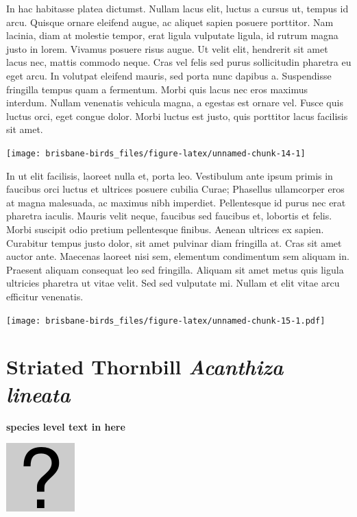 \documentclass[]{book}
\let\origfigure\figure
\let\endorigfigure\endfigure
\renewenvironment{figure}[1][2] {
  \expandafter\origfigure\expandafter[H]
} {
  \endorigfigure
}
\begin{document}
In hac habitasse platea dictumst. Nullam lacus elit, luctus a cursus ut,
tempus id arcu. Quisque ornare eleifend augue, ac aliquet sapien posuere
porttitor. Nam lacinia, diam at molestie tempor, erat ligula vulputate
ligula, id rutrum magna justo in lorem. Vivamus posuere risus augue. Ut
velit elit, hendrerit sit amet lacus nec, mattis commodo neque. Cras vel
felis sed purus sollicitudin pharetra eu eget arcu. In volutpat eleifend
mauris, sed porta nunc dapibus a. Suspendisse fringilla tempus quam a
fermentum. Morbi quis lacus nec eros maximus interdum. Nullam venenatis
vehicula magna, a egestas est ornare vel. Fusce quis luctus orci, eget
congue dolor. Morbi luctus est justo, quis porttitor lacus facilisis sit
amet.

\begin{figure}
\texttt{[image: brisbane-birds\_files/figure-latex/unnamed-chunk-14-1]} \caption{insert figure caption}\label{fig:unnamed-chunk-14}
\end{figure}

In ut elit facilisis, laoreet nulla et, porta leo. Vestibulum ante ipsum
primis in faucibus orci luctus et ultrices posuere cubilia Curae;
Phasellus ullamcorper eros at magna malesuada, ac maximus nibh
imperdiet. Pellentesque id purus nec erat pharetra iaculis. Mauris velit
neque, faucibus sed faucibus et, lobortis et felis. Morbi suscipit odio
pretium pellentesque finibus. Aenean ultrices ex sapien. Curabitur
tempus justo dolor, sit amet pulvinar diam fringilla at. Cras sit amet
auctor ante. Maecenas laoreet nisi sem, elementum condimentum sem
aliquam in. Praesent aliquam consequat leo sed fringilla. Aliquam sit
amet metus quis ligula ultricies pharetra ut vitae velit. Sed sed
vulputate mi. Nullam et elit vitae arcu efficitur venenatis.

\begin{figure}
\centering
\texttt{[image: brisbane-birds\_files/figure-latex/unnamed-chunk-15-1.pdf]}
\caption{\label{fig:unnamed-chunk-15}insert figure caption}
\end{figure}

\section{\texorpdfstring{Striated Thornbill \emph{Acanthiza
lineata}}{Striated Thornbill Acanthiza lineata}}\label{striated-thornbill-acanthiza-lineata}

\textbf{species level text in here}

\begin{figure}
\centering
\includegraphics{assets/missing.png}
\caption{No image for species}
\end{figure}
\end{document}
